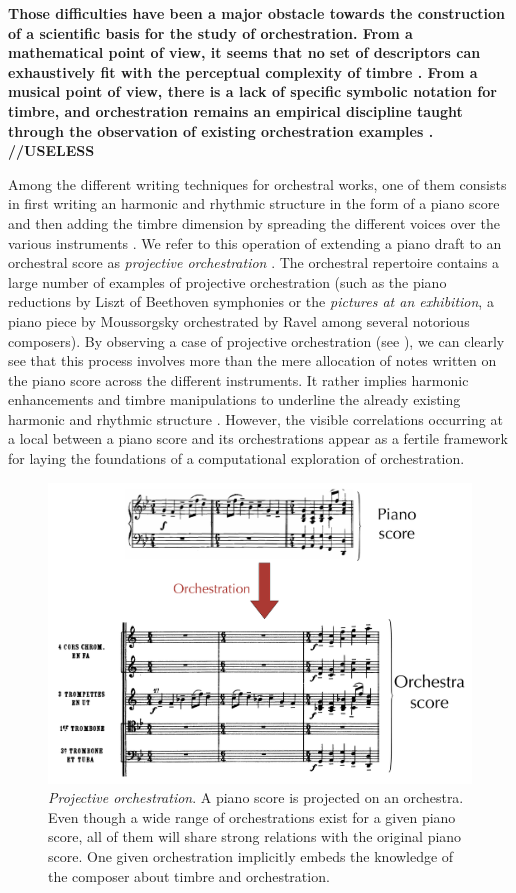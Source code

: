\documentclass{article}
\begin{document}
\textbf{Those difficulties have been a major obstacle towards the construction of a scientific basis for the study of orchestration. From a mathematical point of view, it seems that no set of descriptors can exhaustively fit with the perceptual complexity of timbre \cite{peeters2011timbre}. From a musical point of view, there is a lack of specific symbolic notation for timbre, and orchestration remains an empirical discipline taught through the observation of existing orchestration examples \cite{piston-orch}. //USELESS}

Among the different writing techniques for orchestral works, one of them consists in first writing an harmonic and rhythmic structure in the form of a piano score and then adding the timbre dimension by spreading the different voices over the various instruments \cite{piston-orch}. We refer to this operation of extending a piano draft to an orchestral score as \textit{projective orchestration} \cite{eslingthesis}.
The orchestral repertoire contains a large number of examples of projective orchestration (such as the piano reductions by Liszt of Beethoven symphonies or the \textit{pictures at an exhibition}, a piano piece by Moussorgsky orchestrated by Ravel among several notorious composers). By observing a case of projective orchestration (see ), we can clearly see that this process involves more than the mere allocation of notes written on the piano score across the different instruments. It rather implies harmonic enhancements and timbre manipulations to underline the already existing harmonic and rhythmic structure \cite{mcadams2013timbre}. However, the visible correlations occurring at a local between a piano score and its orchestrations appear as a fertile framework for laying the foundations of a computational exploration of orchestration.

\begin{figure}
\centering
\includegraphics[scale=0.15]{Data_representation/orch}
\caption{\textit{Projective orchestration}. A piano score is projected on an orchestra. Even though a wide range of orchestrations exist for a given piano score, all of them will share strong relations with the original piano score. One given orchestration implicitly embeds the knowledge of the composer about timbre and orchestration.}
\label{fig:orch}
\end{figure}
\end{document}
